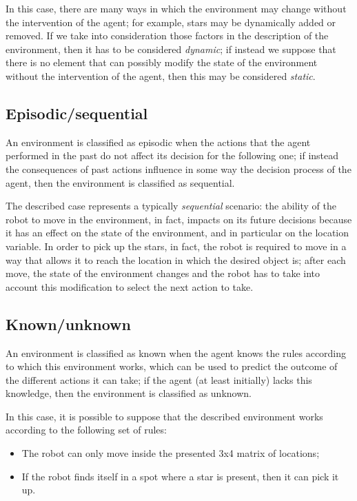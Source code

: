 \documentclass[letterpaper,headings=standardclasses]{scrartcl}
\begin{document}
In this case, there are many ways in which the environment may change without the intervention of the agent; for example, stars may be dynamically added or removed. If we take into consideration those factors in the description of the environment, then it has to be considered \emph{dynamic}; if instead we suppose that there is no element that can possibly modify the state of the environment without the intervention of the agent, then this may be considered \emph{static}.

\subsection{Episodic/sequential}

An environment is classified as episodic when the actions that the agent performed in the past do not affect its decision for the following one; if instead the consequences of past actions influence in some way the decision process of the agent, then the environment is classified as sequential.

The described case represents a typically \emph{sequential} scenario: the ability of the robot to move in the environment, in fact, impacts on its future decisions because it has an effect on the state of the environment, and in particular on the location variable. In order to pick up the stars, in fact, the robot is required to move in a way that allows it to reach the location in which the desired object is; after each move, the state of the environment changes and the robot has to take into account this modification to select the next action to take.

\subsection{Known/unknown}

An environment is classified as known when the agent knows the rules according to which this environment works, which can be used to predict the outcome of the different actions it can take; if the agent (at least initially) lacks this knowledge, then the environment is classified as unknown.

In this case, it is possible to suppose that the described environment works according to the following set of rules:

\begin{itemize}

\item The robot can only move inside the presented 3x4 matrix of locations;
\item If the robot finds itself in a spot where a star is present, then it can pick it up.

\end{itemize}
\end{document}
